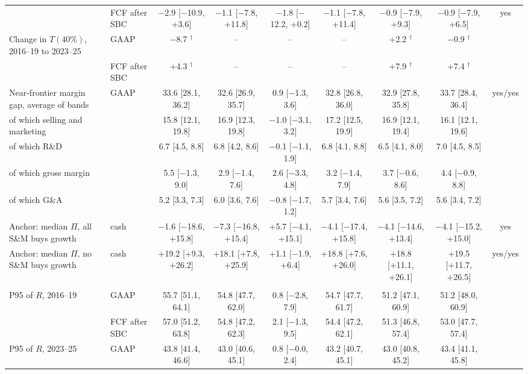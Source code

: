 \begin{table}[t]
{\begin{tabular}{llccccccc}
 & FCF after SBC & $-$2.9 [$-$10.9, +3.6] & $-$1.1 [$-$7.8, +11.8] & $-$1.8 [$-$12.2, +0.2] & $-$1.1 [$-$7.8, +11.4] & $-$0.9 [$-$7.9, +9.3] & $-$0.9 [$-$7.9, +6.5] & yes \\
Change in $T(40\%)$, 2016--19 to 2023--25 & GAAP & $-$8.7 $^\dagger$ & -- & -- & -- & +2.2 $^\dagger$ & $-$0.9 $^\dagger$ &  \\
 & FCF after SBC & +4.3 $^\dagger$ & -- & -- & -- & +7.9 $^\dagger$ & +7.4 $^\dagger$ &  \\
Near-frontier margin gap, average of bands & GAAP & 33.6 [28.1, 36.2] & 32.6 [26.9, 35.7] & 0.9 [$-$1.3, 3.6] & 32.8 [26.8, 36.0] & 32.9 [27.8, 35.8] & 33.7 [28.4, 36.4] & yes/yes \\
\quad of which selling and marketing &  & 15.8 [12.1, 19.8] & 16.9 [12.3, 19.8] & $-$1.0 [$-$3.1, 3.2] & 17.2 [12.5, 19.9] & 16.9 [12.1, 19.4] & 16.1 [12.1, 19.6] &  \\
\quad of which R\&D &  & 6.7 [4.5, 8.8] & 6.8 [4.2, 8.6] & $-$0.1 [$-$1.1, 1.9] & 6.8 [4.1, 8.8] & 6.5 [4.1, 8.0] & 7.0 [4.5, 8.5] &  \\
\quad of which gross margin &  & 5.5 [$-$1.3, 9.0] & 2.9 [$-$1.4, 7.6] & 2.6 [$-$3.3, 4.8] & 3.2 [$-$1.4, 7.9] & 3.7 [$-$0.6, 8.6] & 4.4 [$-$0.9, 8.8] &  \\
\quad of which G\&A &  & 5.2 [3.3, 7.3] & 6.0 [3.6, 7.6] & $-$0.8 [$-$1.7, 1.2] & 5.7 [3.4, 7.6] & 5.6 [3.5, 7.2] & 5.6 [3.4, 7.2] &  \\
Anchor: median $\Pi$, all S\&M buys growth & cash & $-$1.6 [$-$18.6, +15.8] & $-$7.3 [$-$16.8, +15.4] & +5.7 [$-$4.1, +15.1] & $-$4.1 [$-$17.4, +15.8] & $-$4.1 [$-$14.6, +13.4] & $-$4.1 [$-$15.2, +15.0] & yes \\
Anchor: median $\Pi$, no S\&M buys growth & cash & +19.2 [+9.3, +26.2] & +18.1 [+7.8, +25.9] & +1.1 [$-$1.9, +6.4] & +18.8 [+7.6, +26.0] & +18.8 [+11.1, +26.1] & +19.5 [+11.7, +26.5] & yes/yes \\
\addlinespace\multicolumn{9}{l}{\emph{B. Distribution of reported scores (descriptive, E1 primary)}}\\
P95 of $R$, 2016--19 & GAAP & 55.7 [51.1, 64.1] & 54.8 [47.7, 62.0] & 0.8 [$-$2.8, 7.9] & 54.7 [47.7, 61.7] & 51.2 [47.1, 60.9] & 51.2 [48.0, 60.9] &  \\
 & FCF after SBC & 57.0 [51.2, 63.8] & 54.8 [47.2, 62.3] & 2.1 [$-$1.3, 9.5] & 54.4 [47.2, 62.1] & 51.3 [46.8, 57.4] & 53.0 [47.7, 57.4] &  \\
P95 of $R$, 2023--25 & GAAP & 43.8 [41.4, 46.6] & 43.0 [40.6, 45.1] & 0.8 [$-$0.0, 2.4] & 43.2 [40.7, 45.1] & 43.0 [40.8, 45.2] & 43.4 [41.1, 45.8] &  \\

\end{tabular}}
\end{table}
